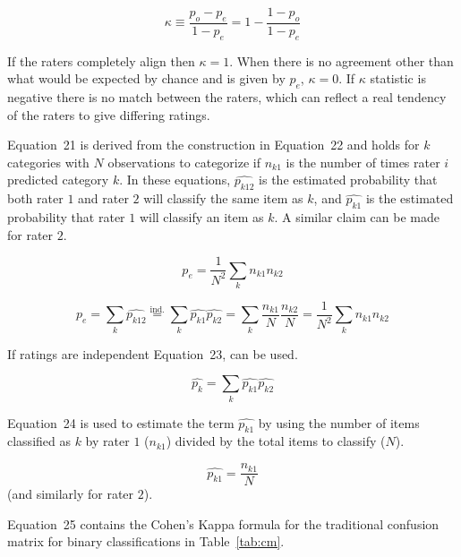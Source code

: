 \documentclass[sn-mathphys-num]{sn-jnl}%
\begin{document}
\begin{equation}
	\kappa \equiv {\frac {p_{o}-p_{e}}{1-p_{e}}}=1-{\frac {1-p_{o}}{1-p_{e}}}
	\label{eqn:20}
\end{equation}

If the raters completely align then $\kappa = 1$. When there is no agreement other than what would be expected by chance and is given by $p_{e}$, $\kappa = 0$. If $\kappa$ statistic is negative \cite{sim2005kappa} there is no match between the raters, which can reflect a real tendency of the raters to give differing ratings.

Equation~21 is derived from the construction in Equation~22 and holds for $k$ categories with $N$ observations to categorize if $n_{k1}$ is the number of times rater $i$ predicted category $k$. In these equations, ${\widehat{p_{k12}}}$ is the estimated probability that both rater $1$ and rater $2$ will classify the same item as $k$, and ${\widehat {p_{k1}}}$ is the estimated probability that rater $1$ will classify an item as $k$. A similar claim can be made for rater $2$.

\begin{equation}
	p_{e}={\frac {1}{N^{2}}}\sum_{k}n_{k1}n_{k2}
	\label{eqn:21}
\end{equation}

\begin{equation}
	p_{e}=\sum_{k}{\widehat {p_{k12}}}{\overset{\text{ind.}}{=}}\sum_{k}{\widehat {p_{k1}}}{\widehat {p_{k2}}}=\sum_{k}{\frac {n_{k1}}{N}}{\frac {n_{k2}}{N}}={\frac {1}{N^{2}}}\sum_{k}n_{k1}n_{k2}
	\label{eqn:22}
\end{equation}

If ratings are independent Equation~23, can be used.

\begin{equation}
	\textstyle{\widehat{p_{k}}}=\sum_{k}{\widehat{p_{k1}}}{\widehat {p_{k2}}}
	\label{eqn:23}
\end{equation}

Equation~24 is used to estimate the term $\widehat{p_{k1}}$ by using the number of items classified as $k$ by rater $1$ ($n_{k1}$) divided by the total items to classify ($N$).

\begin{equation}
	\widehat {p_{k1}}=\frac{n_{k1}}{N}
	\label{eqn:24}
\end{equation}
 (and similarly for rater $2$).
 
Equation~25 contains the Cohen's Kappa formula \cite{chicco2021matthews} for the traditional confusion matrix for binary classifications in Table~\ref{tab:cm}.
\end{document}
